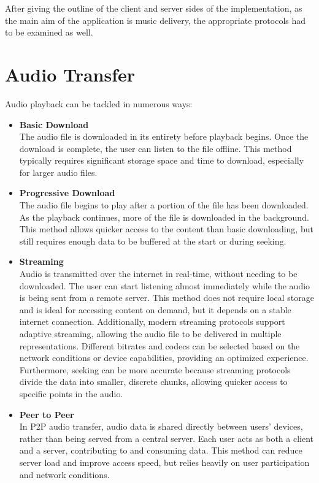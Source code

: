 After giving the outline of the client and server sides of the implementation,
as the main aim of the application is music delivery, the appropriate protocols had to be examined as well.


\section{Audio Transfer}
Audio playback can be tackled in numerous ways:

\begin{itemize}
    \item \textbf{Basic Download}\\
    The audio file is downloaded in its entirety before playback begins.
    Once the download is complete, the user can listen to the file offline.
    This method typically requires significant storage space and time to download,
    especially for larger audio files.

    \item \textbf{Progressive Download}\\
    The audio file begins to play after a portion of the file
    has been downloaded. As the playback continues, more of the file is downloaded
    in the background. This method allows quicker access to the content
    than basic downloading, but still requires enough data to be buffered at the start or during seeking.

    \item \textbf{Streaming}\\
    Audio is transmitted over the internet in real-time, without needing
    to be downloaded. The user can start listening almost immediately while the audio is being
    sent from a remote server. This method does not require local storage and is
    ideal for accessing content on demand, but it depends on a stable internet connection.
    Additionally, modern streaming protocols support adaptive streaming, allowing the audio file
    to be delivered in multiple representations. Different bitrates and codecs can be
    selected based on the network conditions or device capabilities, providing an optimized experience.
    Furthermore, seeking can be more accurate because streaming protocols divide the data into
    smaller, discrete chunks, allowing quicker access to specific points in the audio.

    \item \textbf{Peer to Peer}\\
    In P2P audio transfer, audio data is shared directly between users'
    devices, rather than being served from a central server.
    Each user acts as both a client and a server, contributing to and consuming
    data. This method can reduce server load and improve access speed, but relies heavily on user participation and network conditions.
\end{itemize}

